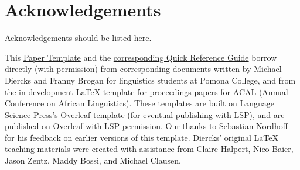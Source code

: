 \documentclass[output=paper,colorlinks,citecolor=brown]{langscibook}
\begin{document}
\section*{Acknowledgements}

Acknowledgements should be listed here.

\noindent This \href{https://www.overleaf.com/latex/templates/field-methods-paper-template/pqrxmrsptqcv}{Paper Template} and the \href{https://www.overleaf.com/latex/templates/field-methods-papers-quick-reference-guide/cqbjxwnffvrm}{corresponding Quick Reference Guide} borrow directly (with permission) from corresponding documents written by Michael Diercks and Franny Brogan for linguistics students at Pomona College, and from the in-development \LaTeX{} template for proceedings papers for ACAL (Annual Conference on African Linguistics). These templates are built on Language Science Press's Overleaf template (for eventual publishing with LSP), and are published on Overleaf with LSP permission. Our thanks to Sebastian Nordhoff for his feedback on earlier versions of this template. Diercks' original \LaTeX{} teaching materials were created with assistance from Claire Halpert, Nico Baier, Jason Zentz, Maddy Bossi, and Michael Clausen.

\printbibliography[heading=subbibliography,notkeyword=this]
\end{document}

